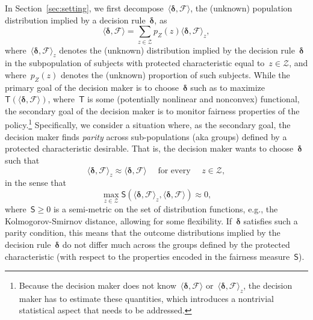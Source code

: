 \documentclass[11pt, a4paper]{article}
\theoremstyle{definition}
\begin{document}
In Section~\ref{sec:setting}, we first decompose~$\langle \bm{\delta}, \mathcal{F} \rangle$, the (unknown) population distribution implied by a decision rule~$\bm{\delta}$, as
%
\begin{equation*}
\langle \bm{\delta}, \mathcal{F} \rangle = \sum_{z \in \mathcal{Z}} p_Z(z) \langle \bm{\delta}, \mathcal{F} \rangle_z,
\end{equation*}
%
where~$\langle \bm{\delta}, \mathcal{F} \rangle_z$ denotes the (unknown) distribution implied by the decision rule~$\bm{\delta}$ in the subpopulation of subjects with protected characteristic equal to~$z \in \mathcal{Z}$, and where~$p_Z(z)$ denotes the (unknown) proportion of such subjects. While the primary goal of the decision maker is to choose~$\bm{\delta}$ such as to maximize~$\mathsf{T}(\langle \bm{\delta}, \mathcal{F} \rangle)$, where~$\mathsf{T}$ is some (potentially nonlinear and nonconvex) functional, the secondary goal of the decision maker is to monitor fairness properties of the policy.\footnote{Because the decision maker does not know~$\langle \bm{\delta}, \mathcal{F} \rangle$ or~$\langle \bm{\delta}, \mathcal{F} \rangle_z$, the decision maker has to estimate these quantities, which introduces a nontrivial statistical aspect that needs to be addressed.} Specifically, we consider a situation where, as the secondary goal, the decision maker finds \emph{parity} across sub-populations (aka groups) defined by a protected characteristic desirable. That is, the decision maker wants to choose~$\bm{\delta}$ such that $$\langle \bm{\delta}, \mathcal{F} \rangle_z \approx \langle \bm{\delta}, \mathcal{F} \rangle \quad \text{ for every } \quad z \in \mathcal{Z},$$ in the sense that $$\max_{z \in \mathcal{Z}} \mathsf{S}\left(\langle \bm{\delta}, \mathcal{F} \rangle_z, \langle \bm{\delta}, \mathcal{F} \rangle\right) \approx 0,$$ where~$\mathsf{S} \geq 0$ is a semi-metric on the set of distribution functions, e.g., the Kolmogorov-Smirnov distance, allowing for some flexibility. If~$\bm{\delta}$ satisfies such a parity condition, this means that the outcome distributions implied by the decision rule~$\bm{\delta}$ do not differ much across the groups defined by the protected characteristic (with respect to the properties encoded in the fairness measure~$\mathsf{S}$).
\end{document}
